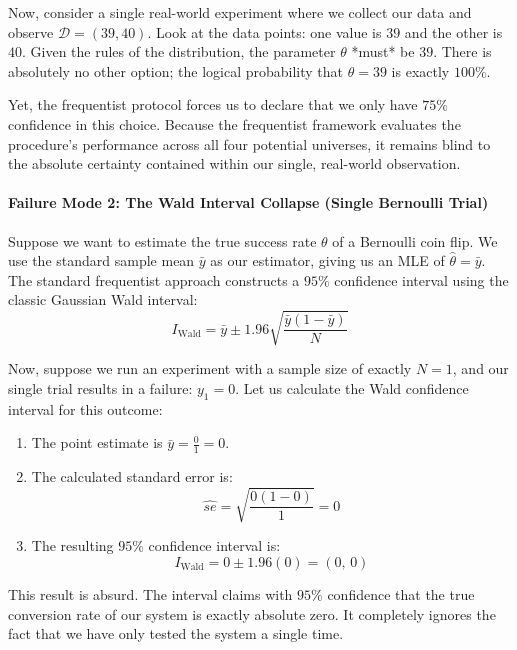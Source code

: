 \documentclass{article}
\begin{document}
Now, consider a single real-world experiment where we collect our data and observe $\mathcal{D} = (39, 40)$. Look at the data points: one value is $39$ and the other is $40$. Given the rules of the distribution, the parameter $\theta$ *must* be $39$. There is absolutely no other option; the logical probability that $\theta = 39$ is exactly $100\%$. 

Yet, the frequentist protocol forces us to declare that we only have $75\%$ confidence in this choice. Because the frequentist framework evaluates the procedure's performance across all four potential universes, it remains blind to the absolute certainty contained within our single, real-world observation.

\paragraph{Failure Mode 2: The Wald Interval Collapse (Single Bernoulli Trial)}
Suppose we want to estimate the true success rate $\theta$ of a Bernoulli coin flip. We use the standard sample mean $\bar{y}$ as our estimator, giving us an MLE of $\hat{\theta} = \bar{y}$. The standard frequentist approach constructs a $95\%$ confidence interval using the classic Gaussian Wald interval:
\begin{equation}
I_{\text{Wald}} = \bar{y} \pm 1.96 \sqrt{\frac{\bar{y}(1 - \bar{y})}{N}}
\end{equation}

Now, suppose we run an experiment with a sample size of exactly $N = 1$, and our single trial results in a failure: $y_1 = 0$. Let us calculate the Wald confidence interval for this outcome:
\begin{enumerate}
    \item The point estimate is $\bar{y} = \frac{0}{1} = 0$.
    \item The calculated standard error is:
    \begin{equation}
    \hat{se} = \sqrt{\frac{0(1 - 0)}{1}} = 0
    \end{equation}
    \item The resulting $95\%$ confidence interval is:
    \begin{equation}
    I_{\text{Wald}} = 0 \pm 1.96(0) = (0, \, 0)
    \end{equation}
\end{enumerate}

This result is absurd. The interval claims with $95\%$ confidence that the true conversion rate of our system is exactly absolute zero. It completely ignores the fact that we have only tested the system a single time. 
\end{document}
